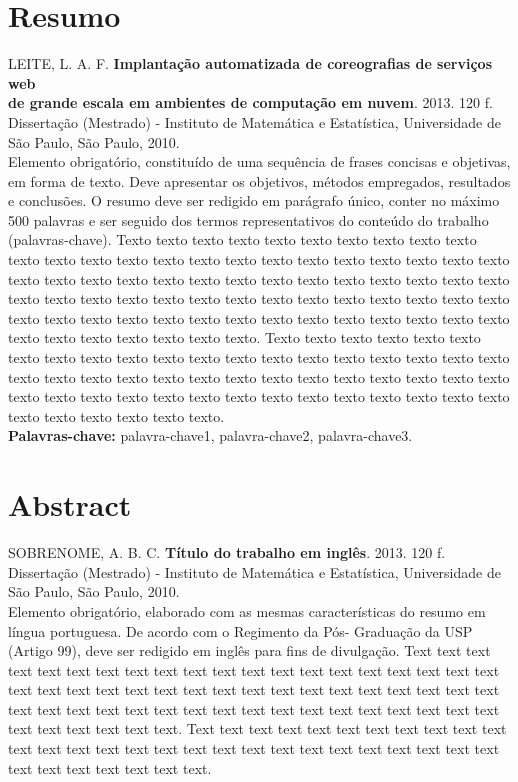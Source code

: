 \documentclass[11pt,twoside,a4paper]{book}
\begin{document}
\chapter*{Resumo}

\noindent LEITE, L. A. F. \textbf{Implantação automatizada de coreografias de serviços web \\
    de grande escala em ambientes de computação em nuvem}. 
2013. 120 f.
Dissertação (Mestrado) - Instituto de Matemática e Estatística,
Universidade de São Paulo, São Paulo, 2010.
\\

Elemento obrigatório, constituído de uma sequência de frases concisas e
objetivas, em forma de texto.  Deve apresentar os objetivos, métodos empregados,
resultados e conclusões.  O resumo deve ser redigido em parágrafo único, conter
no máximo 500 palavras e ser seguido dos termos representativos do conteúdo do
trabalho (palavras-chave). 
Texto texto texto texto texto texto texto texto texto texto texto texto texto
texto texto texto texto texto texto texto texto texto texto texto texto texto
texto texto texto texto texto texto texto texto texto texto texto texto texto
texto texto texto texto texto texto texto texto texto texto texto texto texto
texto texto texto texto texto texto texto texto texto texto texto texto texto
texto texto texto texto texto texto texto texto.
Texto texto texto texto texto texto texto texto texto texto texto texto texto
texto texto texto texto texto texto texto texto texto texto texto texto texto
texto texto texto texto texto texto texto texto texto texto texto texto texto
texto texto texto texto texto texto texto texto texto texto texto texto texto
texto texto.
\\

\noindent \textbf{Palavras-chave:} palavra-chave1, palavra-chave2, palavra-chave3.

\chapter*{Abstract}
\noindent SOBRENOME, A. B. C. \textbf{Título do trabalho em inglês}. 
2013. 120 f.
Dissertação (Mestrado) - Instituto de Matemática e Estatística,
Universidade de São Paulo, São Paulo, 2010.
\\


Elemento obrigatório, elaborado com as mesmas características do resumo em
língua portuguesa. De acordo com o Regimento da Pós- Graduação da USP (Artigo
99), deve ser redigido em inglês para fins de divulgação. 
Text text text text text text text text text text text text text text text text
text text text text text text text text text text text text text text text text
text text text text text text text text text text text text text text text text
text text text text text text text text text text text text.
Text text text text text text text text text text text text text text text text
text text text text text text text text text text text text text text text text
text text text.
\\
\end{document}
